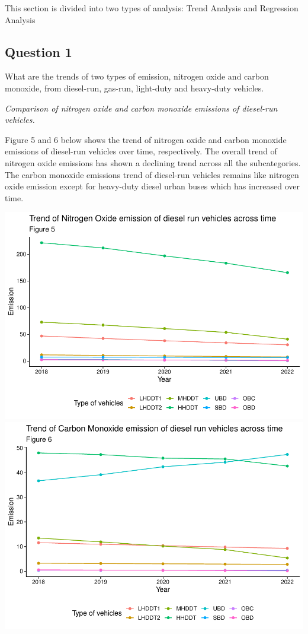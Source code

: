 \documentclass[
  12pt,
]{article}
\begin{document}
This section is divided into two types of analysis: Trend Analysis and
Regression Analysis

\hypertarget{question-1}{%
\subsection{Question 1}\label{question-1}}

What are the trends of two types of emission, nitrogen oxide and carbon
monoxide, from diesel-run, gas-run, light-duty and heavy-duty vehicles.

\emph{Comparison of nitrogen oxide and carbon monoxide emissions of
diesel-run vehicles.}

Figure 5 and 6 below shows the trend of nitrogen oxide and carbon
monoxide emissions of diesel-run vehicles over time, respectively. The
overall trend of nitrogen oxide emissions has shown a declining trend
across all the subcategories. The carbon monoxide emissions trend of
diesel-run vehicles remains like nitrogen oxide emission except for
heavy-duty diesel urban buses which has increased over time.

\includegraphics{Code_Main-Markdown_files/figure-latex/unnamed-chunk-5-1.pdf}
\includegraphics{Code_Main-Markdown_files/figure-latex/unnamed-chunk-5-2.pdf}
\end{document}
